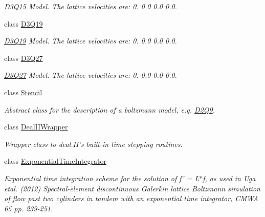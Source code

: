 \begin{DoxyCompactItemize}
\begin{DoxyCompactList}\small\item\em \hyperlink{classnatrium_1_1D3Q15}{D3Q15} Model. The lattice velocities are: 0. 0.0 0.0 0.0. \item\end{DoxyCompactList}\item 
class \hyperlink{classnatrium_1_1D3Q19}{D3Q19}
\begin{DoxyCompactList}\small\item\em \hyperlink{classnatrium_1_1D3Q19}{D3Q19} Model. The lattice velocities are: 0. 0.0 0.0 0.0. \item\end{DoxyCompactList}\item 
class \hyperlink{classnatrium_1_1D3Q27}{D3Q27}
\begin{DoxyCompactList}\small\item\em \hyperlink{classnatrium_1_1D3Q27}{D3Q27} Model. The lattice velocities are: 0. 0.0 0.0 0.0. \item\end{DoxyCompactList}\item 
class \hyperlink{classnatrium_1_1Stencil}{Stencil}
\begin{DoxyCompactList}\small\item\em Abstract class for the description of a boltzmann model, e.g. \hyperlink{classnatrium_1_1D2Q9}{D2Q9}. \item\end{DoxyCompactList}\item 
class \hyperlink{classnatrium_1_1DealIIWrapper}{DealIIWrapper}
\begin{DoxyCompactList}\small\item\em Wrapper class to deal.II's built-\/in time stepping routines. \item\end{DoxyCompactList}\item 
class \hyperlink{classnatrium_1_1ExponentialTimeIntegrator}{ExponentialTimeIntegrator}
\begin{DoxyCompactList}\small\item\em Exponential time integration scheme for the solution of f' = L$\ast$f, as used in Uga etal. (2012) Spectral-\/element discontinuous Galerkin lattice Boltzmann simulation of flow past two cylinders in tandem with an exponential time integrator, CMWA 65 pp. 239-\/251. \item\end{DoxyCompactList}\item 

\end{DoxyCompactItemize}
